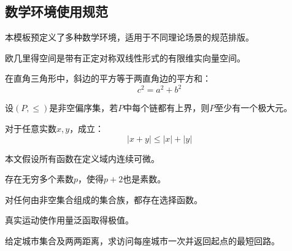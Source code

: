 \documentclass{JYU} %
\begin{document}
\subsection{数学环境使用规范}
本模板预定义了多种数学环境，适用于不同理论场景的规范排版。

\begin{definition}[欧几里得空间]\label{def:euclid}
	欧几里得空间是带有正定对称双线性形式的有限维实向量空间。
\end{definition}

\begin{theorem}[勾股定理]\label{thm:pythagoras}
	在直角三角形中，斜边的平方等于两直角边的平方和：
	\begin{equation}
		c^2 = a^2 + b^2
	\end{equation}
\end{theorem}

\begin{lemma}[Zorn引理]\label{lem:zorn}
	设$(P,\leq)$是非空偏序集，若$P$中每个链都有上界，则$P$至少有一个极大元。
\end{lemma}

\begin{corollary}[三角不等式]\label{col:triangle}
	对于任意实数$x,y$，成立：
	\begin{equation}
		|x+y| \leq |x| + |y|
	\end{equation}
\end{corollary}

\begin{assumption}[光滑性假设]\label{ass:smooth}
	本文假设所有函数在定义域内连续可微。
\end{assumption}

\begin{conjecture}[孪生素数猜想]\label{conj:twinprime}
	存在无穷多个素数$p$，使得$p+2$也是素数。
\end{conjecture}

\begin{axiom}[选择公理]\label{axi:choice}
	对任何由非空集合组成的集合族，都存在选择函数。
\end{axiom}

\begin{principle}[最小作用量原理]\label{pri:action}
	真实运动使作用量泛函取得极值。
\end{principle}

\begin{problem}[旅行商问题]\label{pro:tsp}
	给定城市集合及两两距离，求访问每座城市一次并返回起点的最短回路。
\end{problem}
\end{document}
